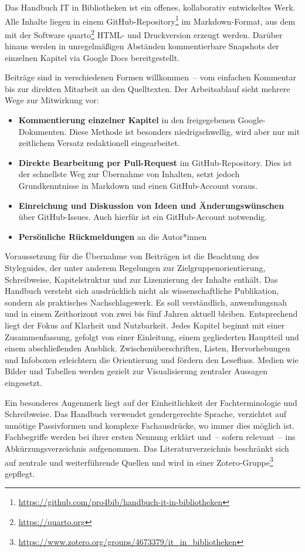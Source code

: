 \documentclass[
  11pt,
  letterpaper,
  DIV=11,
  twoside]{scrreprt}
\providecommand{\tightlist}{%
  \setlength{\itemsep}{0pt}\setlength{\parskip}{0pt}}\usepackage{longtable,booktabs,array}
\DeclareRobustCommand{\href}[2]{#2\footnote{\url{#1}}}
\begin{document}
Das Handbuch IT in Bibliotheken ist ein offenes, kollaborativ
entwickeltes Werk. Alle Inhalte liegen in einem
\href{https://github.com/pro4bib/handbuch-it-in-bibliotheken}{GitHub-Repository}
im Markdown-Format, aus dem mit der Software
\href{https://quarto.org}{quarto} HTML- und Druckversion erzeugt werden.
Darüber hinaus werden in unregelmäßigen Abständen kommentierbare
Snapshots der einzelnen Kapitel via Google Docs bereitgestellt.

Beiträge sind in verschiedenen Formen willkommen~-- vom einfachen
Kommentar bis zur direkten Mitarbeit an den Quelltexten. Der
Arbeitsablauf sieht mehrere Wege zur Mitwirkung vor:

\begin{itemize}
\tightlist
\item
  \textbf{Kommentierung einzelner Kapitel} in den freigegebenen
  Google-Dokumenten. Diese Methode ist besonders niedrigschwellig, wird
  aber nur mit zeitlichem Versatz redaktionell eingearbeitet.
\item
  \textbf{Direkte Bearbeitung per Pull-Request} im GitHub-Repository.
  Dies ist der schnellste Weg zur Übernahme von Inhalten, setzt jedoch
  Grundkenntnisse in Markdown und einen GitHub-Account voraus.
\item
  \textbf{Einreichung und Diskussion von Ideen und Änderungswünschen}
  über GitHub-Issues. Auch hierfür ist ein GitHub-Account notwendig.
\item
  \textbf{Persönliche Rückmeldungen} an die Autor*innen
\end{itemize}

Voraussetzung für die Übernahme von Beiträgen ist die Beachtung des
Styleguides, der unter anderem Regelungen zur Zielgruppenorientierung,
Schreibweise, Kapitelstruktur und zur Lizenzierung der Inhalte enthält.
Das Handbuch versteht sich ausdrücklich nicht als wissenschaftliche
Publikation, sondern als praktisches Nachschlagewerk. Es soll
verständlich, anwendungsnah und in einem Zeithorizont von zwei bis fünf
Jahren aktuell bleiben. Entsprechend liegt der Fokus auf Klarheit und
Nutzbarkeit. Jedes Kapitel beginnt mit einer Zusammenfassung, gefolgt
von einer Einleitung, einem gegliederten Hauptteil und einem
abschließenden Ausblick. Zwischenüberschriften, Listen, Hervorhebungen
und Infoboxen erleichtern die Orientierung und fördern den Lesefluss.
Medien wie Bilder und Tabellen werden gezielt zur Visualisierung
zentraler Aussagen eingesetzt.

Ein besonderes Augenmerk liegt auf der Einheitlichkeit der
Fachterminologie und Schreibweise. Das Handbuch verwendet gendergerechte
Sprache, verzichtet auf unnötige Passivformen und komplexe
Fachausdrücke, wo immer dies möglich ist. Fachbegriffe werden bei ihrer
ersten Nennung erklärt und~-- sofern relevant~-- ins
Abkürzungsverzeichnis aufgenommen. Das Literaturverzeichnis beschränkt
sich auf zentrale und weiterführende Quellen und wird in einer
\href{https://www.zotero.org/groups/4673379/it_in_bibliotheken}{Zotero-Gruppe}
gepflegt.
\end{document}
